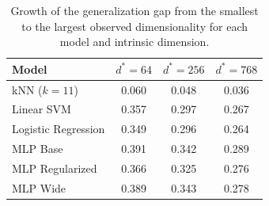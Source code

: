 \begin{table}[h]
\centering
\begin{tabular}{lccc}
\toprule
\textbf{Model} & \textbf{$d^*=64$} & \textbf{$d^*=256$} & \textbf{$d^*=768$} \\
\midrule
kNN ($k=11$) & 0.060 & 0.048 & 0.036 \\
Linear SVM & 0.357 & 0.297 & 0.267 \\
Logistic Regression & 0.349 & 0.296 & 0.264 \\
MLP Base & 0.391 & 0.342 & 0.289 \\
MLP Regularized & 0.366 & 0.325 & 0.276 \\
MLP Wide & 0.389 & 0.343 & 0.278 \\
\bottomrule
\end{tabular}
\caption{Growth of the generalization gap from the smallest to the largest observed dimensionality for each model and intrinsic dimension.}
\label{tab:gap_growth}
\end{table}
